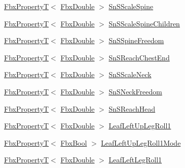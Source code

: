 \begin{DoxyCompactItemize}
\item 
\hyperlink{class_fbx_property_t}{Fbx\+PropertyT}$<$ \hyperlink{fbxtypes_8h_a171e72a1c46fc15c1a6c9c31948c1c5b}{Fbx\+Double} $>$ \hyperlink{class_fbx_character_a03480ecbbb70d96a8032870703c53014}{Sn\+S\+Scale\+Spine}
\item 
\hyperlink{class_fbx_property_t}{Fbx\+PropertyT}$<$ \hyperlink{fbxtypes_8h_a171e72a1c46fc15c1a6c9c31948c1c5b}{Fbx\+Double} $>$ \hyperlink{class_fbx_character_a26540b88221a8923dbb0e7d1d20a9949}{Sn\+S\+Scale\+Spine\+Children}
\item 
\hyperlink{class_fbx_property_t}{Fbx\+PropertyT}$<$ \hyperlink{fbxtypes_8h_a171e72a1c46fc15c1a6c9c31948c1c5b}{Fbx\+Double} $>$ \hyperlink{class_fbx_character_a78286917bf8afed9e0d035202dd7ec95}{Sn\+S\+Spine\+Freedom}
\item 
\hyperlink{class_fbx_property_t}{Fbx\+PropertyT}$<$ \hyperlink{fbxtypes_8h_a171e72a1c46fc15c1a6c9c31948c1c5b}{Fbx\+Double} $>$ \hyperlink{class_fbx_character_a36b24849b40afbde11e78d79425b2e78}{Sn\+S\+Reach\+Chest\+End}
\item 
\hyperlink{class_fbx_property_t}{Fbx\+PropertyT}$<$ \hyperlink{fbxtypes_8h_a171e72a1c46fc15c1a6c9c31948c1c5b}{Fbx\+Double} $>$ \hyperlink{class_fbx_character_a1204d57b85148c61fa3c1720a9a3da2e}{Sn\+S\+Scale\+Neck}
\item 
\hyperlink{class_fbx_property_t}{Fbx\+PropertyT}$<$ \hyperlink{fbxtypes_8h_a171e72a1c46fc15c1a6c9c31948c1c5b}{Fbx\+Double} $>$ \hyperlink{class_fbx_character_abbba368e4fd1c169d32f835a6a4dc41d}{Sn\+S\+Neck\+Freedom}
\item 
\hyperlink{class_fbx_property_t}{Fbx\+PropertyT}$<$ \hyperlink{fbxtypes_8h_a171e72a1c46fc15c1a6c9c31948c1c5b}{Fbx\+Double} $>$ \hyperlink{class_fbx_character_ad880ff31b2b21f37ab5f8a8794fde78d}{Sn\+S\+Reach\+Head}
\item 
\hyperlink{class_fbx_property_t}{Fbx\+PropertyT}$<$ \hyperlink{fbxtypes_8h_a171e72a1c46fc15c1a6c9c31948c1c5b}{Fbx\+Double} $>$ \hyperlink{class_fbx_character_a6674f17d60367d55cbe2b903a688167a}{Leaf\+Left\+Up\+Leg\+Roll1}
\item 
\hyperlink{class_fbx_property_t}{Fbx\+PropertyT}$<$ \hyperlink{fbxtypes_8h_a92e0562b2fe33e76a242f498b362262e}{Fbx\+Bool} $>$ \hyperlink{class_fbx_character_a9508a14e57125380ebe057f87232f05b}{Leaf\+Left\+Up\+Leg\+Roll1\+Mode}
\item 
\hyperlink{class_fbx_property_t}{Fbx\+PropertyT}$<$ \hyperlink{fbxtypes_8h_a171e72a1c46fc15c1a6c9c31948c1c5b}{Fbx\+Double} $>$ \hyperlink{class_fbx_character_abce416295080a2639984a3185fd941fb}{Leaf\+Left\+Leg\+Roll1}

\end{DoxyCompactItemize}
